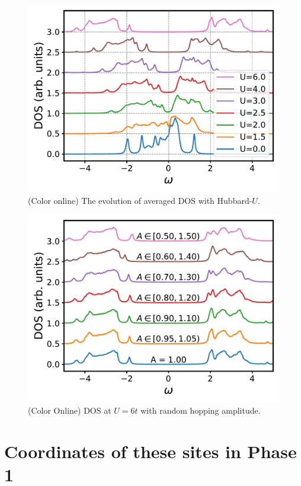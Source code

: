 \documentclass[aps,prb,reprint,amsfonts,amsmath,amssymb,showpacs,groupedaddress,superscriptaddress]{revtex4-1}
\begin{document}
\begin{figure}[p]
    \includegraphics[width=\columnwidth]{fig/CPTForPhase2andPhase3.pdf}
    \caption{\label{fig:CPTForPhase2andPhase3} (Color online) The evolution of averaged DOS with Hubbard-$U$.}
\end{figure}

\begin{figure}
    \includegraphics[width=\columnwidth]{fig/CPTForPhase2andPhase3Random.pdf}
    \caption{\label{fig:CPTForPhase2andPhase3Random} (Color Online) DOS at $U = 6t$ with random hopping amplitude.}
\end{figure}

\appendix

\section{\label{appx:Coordinates}Coordinates of these sites in Phase 1}
\end{document}
